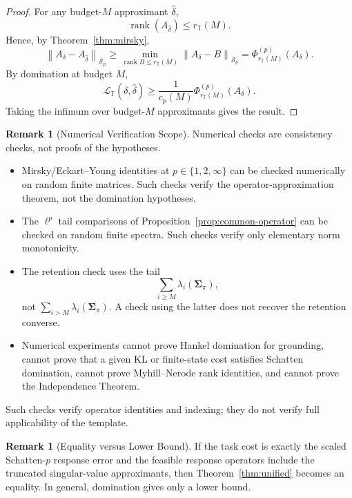 \documentclass[12pt]{article}
\theoremstyle{definition}
\newtheorem{remark}[theorem]{Remark}
\DeclareMathOperator{\rank}{rank}
\newcommand{\norm}[1]{\left\lVert#1\right\rVert}
\newcommand{\Sp}[1]{\mathcal S_{#1}}
\begin{document}
\begin{proof}
For any budget-$M$ approximant $\widehat\delta$,
\[
\rank(A_{\widehat\delta})
\le
r_{\mathbb T}(M).
\]
Hence, by Theorem~\ref{thm:mirsky},
\[
\norm{A_\delta-A_{\widehat\delta}}_{\Sp{p}}
\ge
\min_{\rank B\le r_{\mathbb T}(M)}
\norm{A_\delta-B}_{\Sp{p}}
=
\Phi^{(p)}_{r_{\mathbb T}(M)}(A_\delta).
\]
By domination at budget $M$,
\[
\mathcal L_{\mathbb T}(\delta,\widehat\delta)
\ge
\frac1{c_p(M)}
\Phi^{(p)}_{r_{\mathbb T}(M)}(A_\delta).
\]
Taking the infimum over budget-$M$ approximants gives the result.
\end{proof}

\begin{remark}[Numerical Verification Scope]
\label{rem:schatten-numerical-scope}
Numerical checks are consistency checks, not proofs of the hypotheses.
\begin{itemize}[leftmargin=1.6em]
\item Mirsky/Eckart--Young identities at $p\in\{1,2,\infty\}$ can be checked
numerically on random finite matrices.  Such checks verify the
operator-approximation theorem, not the domination hypotheses.
\item The $\ell^p$ tail comparisons of Proposition~\ref{prop:common-operator}
can be checked on random finite spectra.  Such checks verify only
elementary norm monotonicity.
\item The retention check uses the tail
\[
\sum_{i\ge M}
\lambda_i(\bm{\Sigma}_\pi),
\]
not $\sum_{i>M}\lambda_i(\bm{\Sigma}_\pi)$.  A check using the latter does
not recover the retention converse.
\item Numerical experiments cannot prove Hankel domination for grounding,
cannot prove that a given KL or finite-state cost satisfies Schatten
domination, cannot prove Myhill--Nerode rank identities, and cannot
prove the Independence Theorem.
\end{itemize}
Such checks verify operator identities and indexing; they do not verify full
applicability of the template.
\end{remark}

\begin{remark}[Equality versus Lower Bound]
\label{rem:unified-equality}
If the task cost is exactly the scaled Schatten-$p$ response error and the
feasible response operators include the truncated singular-value approximants,
then Theorem~\ref{thm:unified} becomes an equality.  In general, domination
gives only a lower bound.
\end{remark}
\end{document}
